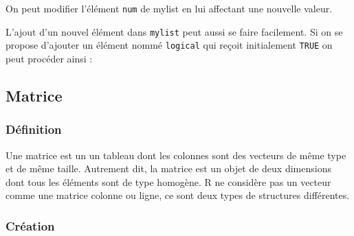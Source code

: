 \documentclass[
]{book}
\newenvironment{Shaded}{\begin{snugshade}}{\end{snugshade}}
\newcommand{\CommentTok}[1]{\textcolor[rgb]{0.56,0.35,0.01}{\textit{#1}}}
\newcommand{\ConstantTok}[1]{\textcolor[rgb]{0.00,0.00,0.00}{#1}}
\newcommand{\DecValTok}[1]{\textcolor[rgb]{0.00,0.00,0.81}{#1}}
\newcommand{\NormalTok}[1]{#1}
\newcommand{\OtherTok}[1]{\textcolor[rgb]{0.56,0.35,0.01}{#1}}
\newcommand{\SpecialCharTok}[1]{\textcolor[rgb]{0.00,0.00,0.00}{#1}}
\begin{document}
On peut modifier l'élément \texttt{num} de mylist en lui affectant une nouvelle valeur.

\begin{Shaded}
\end{Shaded}

L'ajout d'un nouvel élément dans \texttt{mylist} peut aussi se faire facilement. Si on se propose d'ajouter un élément nommé \texttt{logical} qui reçoit initialement \texttt{TRUE} on peut procéder ainsi :

\begin{Shaded}
\end{Shaded}

\hypertarget{matrice}{%
\subsection{Matrice}\label{matrice}}

\hypertarget{duxe9finition-3}{%
\subsubsection*{Définition}\label{duxe9finition-3}}

Une matrice est un un tableau dont les colonnes sont des vecteurs de même type et de même taille. Autrement dit, la matrice est un objet de deux dimensions dont tous les éléments sont de type homogène. R ne considère pas un vecteur comme une matrice colonne ou ligne, ce sont deux types de structures différentes.

\hypertarget{cruxe9ation-3}{%
\subsubsection*{Création}\label{cruxe9ation-3}}
\end{document}
